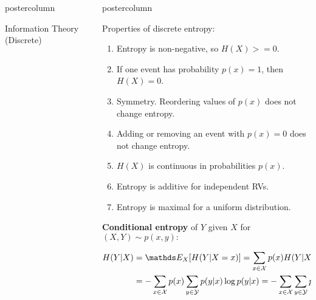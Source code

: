 \documentclass{beamer}
\newlength{\columnheight} %
\begin{document}
\begin{frame}[fragile]{}
\begin{columns}
\begin{column}{.31\textwidth}
\begin{beamercolorbox}[center]{postercolumn}
\begin{minipage}{.98\textwidth}
{\begin{myblock}{Information Theory (Discrete)}
\end{myblock}

 
				}
			\end{minipage}
		\end{beamercolorbox}
	\end{column}
	\begin{column}{.31\textwidth}
		\begin{beamercolorbox}[center]{postercolumn}
			\begin{minipage}{.98\textwidth}
				\parbox[t][\columnheight]{\textwidth}{


\begin{myblock}{} \vspace{-4ex}
Properties of discrete entropy:
\begin{enumerate}
	\setlength{\itemindent}{+.3in}
\item Entropy is non-negative, so $H(X) >= 0$.
\item If one event has probability $p(x) = 1$, then $H(X)=0$. 
\item Symmetry. Reordering values of $p(x)$ does not change entropy.
\item Adding or removing an event with $p(x)=0$ does not change entropy.
\item $H(X)$ is continuous in probabilities $p(x)$.
\item Entropy is additive for independent RVs.
\item Entropy is maximal for a uniform distribution.
\end{enumerate}
%
\vspace*{1ex}
\textbf{Conditional entropy} of $Y$  given $X$ for $(X, Y) \sim p(x, y):$
% 
\vspace{-0.2cm}
%
\begin{small}  
\begin{equation*}\begin{aligned}
		H(Y | X) &= \E_X[H(Y|X=x)] = \sum_{x \in \Xspace} p(x) H(Y | X=x) \\
		&=-\sum_{x \in \Xspace} p(x) \sum_{y \in \Yspace} p(y | x) \log p(y | x) 
		=-\sum_{x \in \Xspace} \sum_{y \in \Yspace} p(x, y) \log p(y | x)  

\end{aligned}
\end{equation*}
\end{small}
\end{myblock}}
\end{minipage}
\end{beamercolorbox}
\end{column}
\end{columns}
\end{frame}
\end{document}
